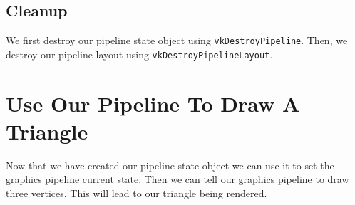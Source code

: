 \subsection{Cleanup}

We first destroy our pipeline state object using \texttt{vkDestroyPipeline}.
Then, we destroy our pipeline layout using \texttt{vkDestroyPipelineLayout}.

\section{Use Our Pipeline To Draw A Triangle}

Now that we have created our pipeline state object we can use it
to set the graphics pipeline current state.
Then we can tell our graphics pipeline to draw three vertices.
This will lead to our triangle being rendered.

\begin{minipage}{\linewidth}{\noindent}
    
\end{minipage}
